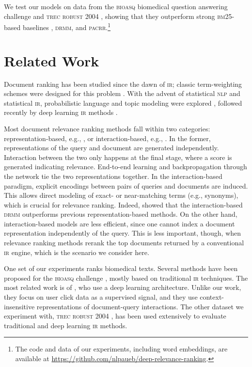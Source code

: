\documentclass[11pt,a4paper]{article}
\newcommand{\ir}{\textsc{ir}\xspace}
\newcommand{\nlp}{\textsc{nlp}\xspace}
\newcommand{\bioasq}{\textsc{bioasq}\xspace}
\newcommand{\trecrob}{\textsc{trec robust}\xspace}
\newcommand{\drmm}{\textsc{drmm}\xspace}
\newcommand{\pacrr}{\textsc{pacrr}\xspace}
\newcommand{\bmtf}{\textsc{bm25}\xspace}
\begin{document}
We test our models on data from the \bioasq biomedical question answering challenge \cite{tsatsaronis2015overview} 
and \trecrob 2004 \cite{voorhees2005trec}, showing that they outperform strong \bmtf-based baselines \cite{robertson2009probabilistic}, \drmm, and \pacrr.\footnote{The code and data of our experiments, including word embeddings, are available at \url{https://github.com/nlpaueb/deep-relevance-ranking}.}



\section{Related Work}
\label{sec:related}

Document ranking has been studied since the dawn of \ir; classic term-weighting schemes were designed for this problem \cite{sparck1972statistical,robertson1976relevance}. With the advent of statistical \nlp and statistical \ir, probabilistic language and topic modeling were explored \cite{zhai2001study,wei2006lda}, followed  recently by deep learning \ir methods \cite{lu2013deep,hu2014convolutional,palangi2016deep,guo2016deep,hui2017pacrr}.

Most document relevance ranking methods fall within two categories: representation-based, e.g., , or interaction-based, e.g., . In the former, representations of the query and document are generated independently. Interaction between the two only happens at the final stage, where a score is generated indicating relevance. End-to-end learning and backpropagation through the network tie the two representations together. In the interaction-based paradigm, 
explicit encodings between pairs of queries and documents are induced. This allows direct modeling of exact- or near-matching terms (e.g., synonyms), which is crucial for relevance ranking.
Indeed,  showed that the interaction-based \drmm  outperforms previous representation-based methods. 
On the other hand, interaction-based models are less efficient, since one cannot index a document representation independently of the query. This is less important, though, when relevance ranking methods rerank the top documents returned by a conventional \ir engine, which is the scenario we consider here.

One set of our experiments ranks biomedical texts. Several methods have been proposed for the \bioasq challenge \cite{tsatsaronis2015overview}, mostly based on traditional \ir techniques. The most related work is of , who use a deep learning architecture. Unlike our work, they focus on 
user click data as a supervised signal, and they use 
context-insensitive representations of document-query interactions.
The other dataset we experiment with, \trecrob 2004 \cite{voorhees2005trec}, has been used extensively to evaluate 
traditional and deep learning \ir methods. 
\end{document}
